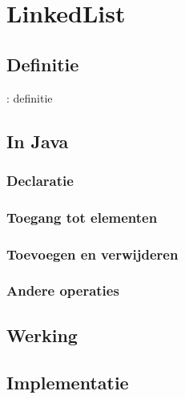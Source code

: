 \section{LinkedList}
\subsection{Definitie}
\begin{frame}{\dslinkedlist{}: definitie}
\begin{definition}[\dslinkedlist{}]

\end{definition}
\end{frame}
\subsection{In Java}
\subsubsection{Declaratie}
\subsubsection{Toegang tot elementen}
\subsubsection{Toevoegen en verwijderen}
\subsubsection{Andere operaties}
\subsection{Werking}
\subsection{Implementatie}